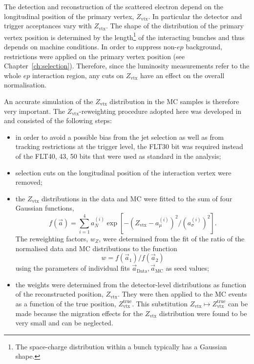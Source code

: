 The detection and reconstruction of the scattered electron depend on the longitudinal position of the primary vertex, $Z_\text{vtx}$. In particular the detector and trigger acceptances vary with $Z_\text{vtx}$. The shape of the distribution of the primary vertex position is determined by the length\footnote{The space-charge distribution within a bunch typically has a Gaussian shape.} of the interacting bunches and thus depends on machine conditions. In order to suppress non-$ep$ background, restrictions were applied on the primary vertex position (see Chapter~\ref{ch:selection}). Therefore, since the luminosity measurements refer to the whole $ep$ interaction region, any cuts on $Z_\text{vtx}$ have an effect on the overall normalisation. 

An accurate simulation of the $Z_\text{vtx}$ distribution in the MC samples is therefore very important. The $Z_\text{vtx}$-reweighting procedure adopted here was developed in~\cite{thesis:behr:2010} and consisted of the following steps:
\begin{itemize}
 \item in order to avoid a possible bias from the jet selection as well as from tracking restrictions at the trigger level, the FLT30 bit was required instead of the FLT40, 43, 50 bits that were used as standard in the analysis;
 \item selection cuts on the longitudinal position of the interaction vertex were removed;
 \item the $Z_\text{vtx}$ distributions in the data and MC were fitted to the sum of four Gaussian functions, 
\begin{equation}
f\left(\vec a\right)=\sum_{i=1}^4{a_N^{\left(i\right)}\exp{\left[-\left(Z_\text{vtx}-a_{\mu}^{\left(i\right)}\right)^2/\left(a_\sigma^{\left(i\right)}\right)^2\right]}}.
\label{eq:fourgauss}
\end{equation}
 The reweighting factors, $w_{Z}$, were determined from the fit of the ratio of the normalised data and MC distributions to the function 
\begin{equation}
w=f\left(\vec a_1\right)/f\left(\vec a_2\right)
\label{eq:zvtxweght}
\end{equation}
 using the parameters of individual fits $\vec a_{\mathrm{Data}}, \vec a_{\mathrm{MC}}$ as seed values;
 \item the weights were determined from the detector-level distributions as function of the reconstructed position, $Z_\text{vtx}$. They were then applied to the MC events as a function of the true position, $Z_\text{vtx}^\text{true}$. This substitution $Z_\text{vtx} \mapsto Z_\text{vtx}^\text{true}$ can be made because the migration effects for the $Z_\text{vtx}$ distribution were found to be very small and can be neglected.
\end{itemize}

